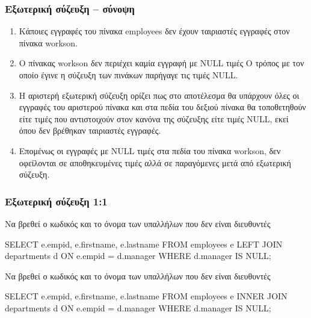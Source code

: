 \begin{frame}
\frametitle{Εξωτερική σύζευξη -- σύνοψη}
\begin{minipage}{\wE}
\pause
\begin{enumerate} \itemsep 4pt %
  \item Κάποιες εγγραφές του πίνακα {\ra employees} δεν έχουν ταιριαστές
        εγγραφές στον πίνακα {\ra workson}.
  \item Ο πίνακας {\ra workson} δεν περιέχει καμία εγγραφή με {\sq NULL} τιμές
        Ο τρόπος με τον οποίο έγινε η σύζευξη 
        των πινάκων παρήγαγε τις τιμές {\sq NULL}.
  \item Η αριστερή εξωτερική σύζευξη ορίζει πως
        στο αποτέλεσμα θα υπάρχουν όλες οι εγγραφές του αριστερού πίνακα και
        στα πεδία του δεξιού πίνακα θα τοποθετηθούν είτε τιμές που αντιστοιχούν
        στον κανόνα της σύζευξης είτε τιμές {\sq NULL},
        εκεί όπου δεν βρέθηκαν ταιριαστές εγγραφές.
  \item Επομένως οι  εγγραφές με {\sq NULL} τιμές στα πεδία του   πίνακα {\ra workson},
        δεν οφείλονται σε αποθηκευμένες τιμές   αλλά σε παραγόμενες μετά από
        εξωτερική σύζευξη.
\end{enumerate}
\end{minipage}
\end{frame}


\begin{frame}
\frametitle{Εξωτερική σύζευξη 1:1}
\begin{minipage}{\wE}
\vspace{-0.5cm}
\begin{exampleblock}{\small Να βρεθεί ο κωδικός και το όνομα των υπαλλήλων που δεν είναι διευθυντές}
\en
\begin{SQL}
  SELECT e.empid, e.firstname, e.lastname
    FROM employees e LEFT JOIN departments d
         ON e.empid = d.manager   
   WHERE d.manager IS NULL;
\end{SQL}
\end{exampleblock}
\el
\vspace{-0.2cm}
\pause
\begin{alertblock}{\small Να βρεθεί ο κωδικός και το όνομα των υπαλλήλων που δεν είναι διευθυντές}
\en
\begin{SQL}
  SELECT e.empid, e.firstname, e.lastname
    FROM employees e INNER JOIN departments d
         ON e.empid = d.manager
   WHERE d.manager IS NULL;
\end{SQL}
\end{alertblock}
\end{minipage}
\end{frame}


